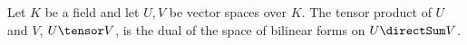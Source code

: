 
\begin{definition}
   Let $K$ be a field and let $U, V$ be vector spaces over $K$.
   The tensor product of $U$ and $V$, $U\tensor V$,
   is the dual of the space of bilinear forms on $U\directSum V$.
\end{definition}
